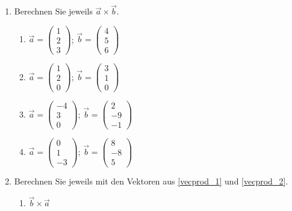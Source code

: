 \documentclass[12pt,a4paper,twoside,fleqn]{article}
\begin{document}
\begin{enumerate}
\item Berechnen Sie jeweils $\vec{a}\times\vec{b}$.
  \begin{multicols}{2}
    \begin{enumerate}
    \item $\vec{a} = 
\begin{pmatrix}
  1\\2\\3
\end{pmatrix}$;
$\vec{b} = \begin{pmatrix}
  4\\5\\6
\end{pmatrix} $
\item \label{vecprod_1}
$\vec{a} = 
\begin{pmatrix}
  1\\2\\0
\end{pmatrix}$;
$\vec{b} = \begin{pmatrix}
  3\\1\\0
\end{pmatrix} $
\item\label{vecprod_2}
  $\vec{a} = 
\begin{pmatrix}
  -4\\3\\0
\end{pmatrix}$;
$\vec{b} = \begin{pmatrix}
  2\\-9\\-1
\end{pmatrix} $
\item  $\vec{a} = 
\begin{pmatrix}
  0\\1\\-3
\end{pmatrix}$;
$\vec{b} = \begin{pmatrix}
  8\\-8\\5
\end{pmatrix} $
    \end{enumerate}
  \end{multicols}
\item Berechnen Sie jeweils mit den Vektoren aus \ref{vecprod_1} und \ref{vecprod_2}.
  \begin{multicols}{3}
    \begin{enumerate}
    \item $\vec{b}\times\vec{a}$

\end{enumerate}
\end{multicols}
\end{enumerate}
\end{document}
